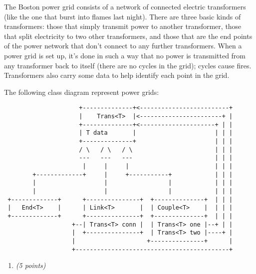 \documentclass[11pt]{article}
\def\pts#1{\marginpar{\footnotesize \raggedright  \fbox{#1 {\sc Points}}}}
\newcounter{Pctr}
\newenvironment{problem}{\stepcounter{Pctr}%
\begin{description}
\item[\noindent{\bf Problem} \arabic{Pctr}] 
\end{description}}{\relax}
\begin{document}
\vfill\thispagestyle{empty}
\newpage

\pts{34}
\begin{problem}

The Boston power grid consists of a network of connected electric
transformers (like the one that burst into flames last night).  There
are three basic kinds of transformers: those that simply transmit
power to another transformer, those that split electricity to two
other transformers, and those that are the end points of the power
network that don't connect to any further transformers.  When a power
grid is set up, it's done in such a way that no power is transmitted
from any transformer back to itself (there are no cycles in the grid);
cycles cause fires.  Transformers also carry some data to help
identify each point in the grid.

The following class diagram represent power grids:

\begin{verbatim}
                     +--------------+<-------------------------+
                     |    Trans<T>  |<-----------------------+ |
                     +--------------+<---------------------+ | |
                     | T data       |                      | | |
                     +--------------+                      | | |
                     / \   / \   / \                       | | |
                     ---   ---   ---                       | | |
                      |     |     |                        | | |
        +-------------+     |     +-----------+            | | |
        |                   |                 |            | | |
        |                   |                 |            | | |
 +-------------+      +---------------+  +--------------+  | | |
 |   End<T>    |      | Link<T>       |  | Couple<T>    |  | | |
 +-------------+      +---------------+  +--------------+  | | |
                   +--| Trans<T> conn |  | Trans<T> one |--+ | |
                   |  +---------------+  | Trans<T> two |----+ |
                   |                    +---------------+      |
                   +-------------------------------------------+
\end{verbatim}


\begin{enumerate}


\newpage
\item {\em{(5 points)}}


\end{enumerate}
\end{problem}
\end{document}
